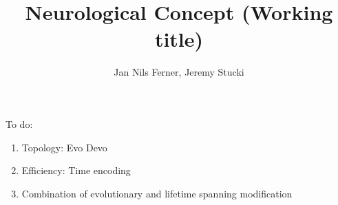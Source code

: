 \documentclass[a4paper]{article}
\title{Neurological Concept (Working title)}
\author{Jan Nils Ferner, Jeremy Stucki}
\begin{document}
\maketitle
\thispagestyle{empty}

\clearpage

\twocolumn

\begin{abstract}
	
\end{abstract}

\clearpage

\onecolumn
\tableofcontents
\twocolumn

\clearpage

To do:
\begin{enumerate}
	\item Topology: Evo Devo
	\item Efficiency: Time encoding
	\item Combination of evolutionary and lifetime spanning modification
\end{enumerate}





\clearpage

\nocite{*}


\end{document}
